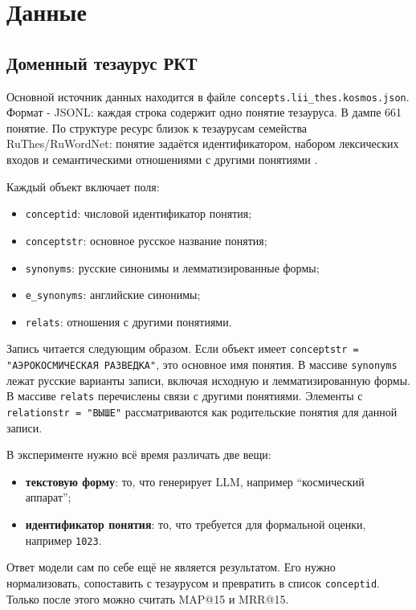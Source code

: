\documentclass[12pt,a4paper,oneside,openany]{report}
\begin{document}
\chapter{Данные}

\section{Доменный тезаурус РКТ}

Основной источник данных находится в файле \texttt{concepts.lii\_thes.kosmos.json}. Формат - JSONL: каждая строка содержит одно понятие тезауруса. В дампе 661 понятие. По структуре ресурс близок к тезаурусам семейства RuThes/RuWordNet: понятие задаётся идентификатором, набором лексических входов и семантическими отношениями с другими понятиями \cite{louk2010,loukachevitch2002,ruwordnet}.

Каждый объект включает поля:
\begin{itemize}
  \item \texttt{conceptid}: числовой идентификатор понятия;
  \item \texttt{conceptstr}: основное русское название понятия;
  \item \texttt{synonyms}: русские синонимы и лемматизированные формы;
  \item \texttt{e\_synonyms}: английские синонимы;
  \item \texttt{relats}: отношения с другими понятиями.
\end{itemize}

Запись читается следующим образом. Если объект имеет \texttt{conceptstr = "АЭРОКОСМИЧЕСКАЯ РАЗВЕДКА"}, это основное имя понятия. В массиве \texttt{synonyms} лежат русские варианты записи, включая исходную и лемматизированную формы. В массиве \texttt{relats} перечислены связи с другими понятиями. Элементы с \texttt{relationstr = "ВЫШЕ"} рассматриваются как родительские понятия для данной записи.

В эксперименте нужно всё время различать две вещи:
\begin{itemize}
  \item \textbf{текстовую форму}: то, что генерирует LLM, например ``космический аппарат'';
  \item \textbf{идентификатор понятия}: то, что требуется для формальной оценки, например \texttt{1023}.
\end{itemize}

Ответ модели сам по себе ещё не является результатом. Его нужно нормализовать, сопоставить с тезаурусом и превратить в список \texttt{conceptid}. Только после этого можно считать MAP@15 и MRR@15.
\end{document}
